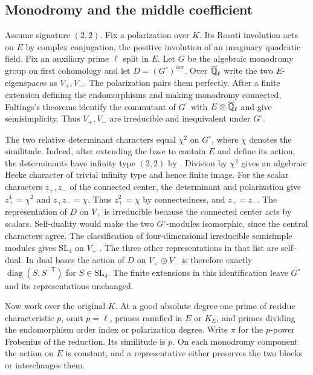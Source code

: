 \subsection{Monodromy and the middle coefficient}

Assume signature \((2,2)\). Fix a polarization over \(K\). Its Rosati
involution acts on \(E\) by complex conjugation, the positive
involution of an imaginary quadratic field. Fix an auxiliary prime
\(\ell\) split in \(E\). Let \(G\) be the algebraic monodromy group
on first cohomology and let \(D=(G^\circ)^{\mathrm{der}}\). Over
\(\overline{\mathbb Q}_\ell\) write the two \(E\)-eigenspaces as \(V_+,V_-\).
The polarization pairs them perfectly. After a finite extension
defining the endomorphisms and making monodromy connected, Faltings's
theorems \cite[Theorems~3--4]{faltings} identify the commutant of
\(G^\circ\) with \(E\otimes\overline{\mathbb Q}_\ell\) and give semisimplicity.
Thus \(V_+,V_-\) are irreducible and inequivalent under \(G^\circ\).

The two relative determinant characters equal \(\chi^2\) on
\(G^\circ\), where \(\chi\) denotes the similitude. Indeed, after
extending the base to contain \(E\) and define its action, the
determinants have infinity type \((2,2)\) by
\cite[Proposition~14]{fite}. Division by \(\chi^2\) gives an algebraic
Hecke character of trivial infinity type and hence finite image. For
the scalar characters \(z_+,z_-\) of the connected center, the
determinant and polarization give \(z_+^4=\chi^2\) and
\(z_+z_-=\chi\). Thus \(z_+^2=\chi\) by connectedness, and
\(z_+=z_-\). The representation of \(D\) on \(V_+\) is irreducible
because the connected center acts by scalars. Self-duality would make
the two \(G^\circ\)-modules isomorphic, since the central characters
agree. The classification of four-dimensional irreducible semisimple
modules gives \(\mathrm{SL}_4\) on \(V_+\) \cite[\S3.1]{hui4}. The
three other representations in that list are self-dual. In dual bases
the action of \(D\) on \(V_+\oplus V_-\) is
therefore exactly \(\operatorname{diag}(S,S^{-\mathsf T})\) for
\(S\in\mathrm{SL}_4\). The finite extensions in this identification
leave \(G^\circ\) and its representations unchanged.

Now work over the original \(K\). At a good absolute degree-one prime
of residue characteristic \(p\), omit \(p=\ell\), primes ramified in
\(E\) or \(K_E\), and primes dividing the endomorphism order index or
polarization degree. Write \(\pi\) for the \(p\)-power Frobenius of the
reduction. Its similitude is \(p\). On each monodromy component the
action on \(E\) is constant, and a representative either preserves the
two blocks or interchanges them.

